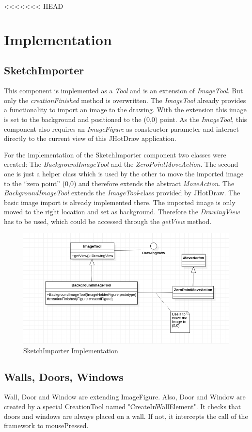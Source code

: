 <<<<<<< HEAD
\section{Implementation}

\subsection{SketchImporter}

This component is implemented as a \textit{Tool} and is an extension of \textit{ImageTool}. But only the \textit{creationFinished} method is overwritten. The \textit{ImageTool} already provides a functionality to import an image to the drawing. With the extension this image is set to the background and positioned to the (0,0) point. As the \textit{ImageTool}, this component also requires an \textit{ImageFigure} as constructor parameter and interact directly to the current view of this JHotDraw application.

For the implementation of the SketchImporter component two classes were created: The \textit{BackgroundImageTool} and the \textit{ZeroPointMoveAction}. The second one is just a helper class which is used by the other to move the imported image to the "`zero point"' (0,0) and therefore extends the abstract \textit{MoveAction}.
The \textit{BackgroundImageTool} extends the \textit{ImageTool}-class provided by JHotDraw. The basic image import is already implemented there. The imported image is only moved to the right location and set as background. Therefore the \textit{DrawingView} has to be used, which could be accessed through the \textit{getView} method.

\begin{figure}[h]
    \includegraphics[keepaspectratio,width=\textwidth]{images/SketchImporter.png}
    \caption{SketchImporter Implementation}
\end{figure}

\subsection{Walls, Doors, Windows}

Wall, Door and Window are extending ImageFigure.
Also, Door and Window are created by a special CreationTool named "CreateInWallElement".
It checks that doors and windows are always placed on a wall.
If not, it intercepts the call of the framework to mousePressed.

